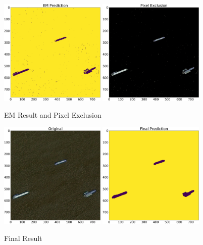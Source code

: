 \begin{figure}[h] 
	\centering
	\includegraphics[width=0.45\textwidth]{Pictures/011EMPred.png}
	\includegraphics[width=0.45\textwidth]{Pictures/014PixelExclusion.png}
	\caption{EM Result and Pixel Exclusion}
	\label{em_pic_unet}
\end{figure}
\begin{figure}[H]
	\centering
	\includegraphics[width=0.45\textwidth]{Pictures/011Original.png}
	\includegraphics[width=0.45\textwidth]{Pictures/014FinalResult.png}
	\caption{Final Result}
	\label{final_result_pic_unet}
\end{figure}